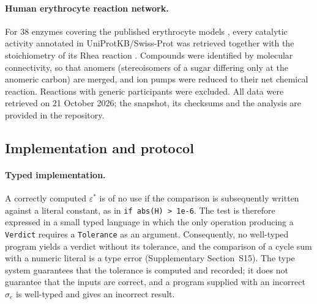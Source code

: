 \documentclass[11pt,a4paper]{article}
\theoremstyle{pstyle}
\theoremstyle{definition}
\theoremstyle{remark}
\newcommand{\cf}[1]{\texttt{#1}}
\newcommand{\eps}{\varepsilon}
\newcommand{\epsstar}{\eps^{\ast}}
\begin{document}
\paragraph{Human erythrocyte reaction network.} For $38$ enzymes
covering the published erythrocyte models \citep{mulquiney1999}, every
catalytic activity annotated in UniProtKB/Swiss-Prot
\citep{uniprot2025} was retrieved together with the stoichiometry of its
Rhea reaction \citep{bansal2022}. Compounds were identified by molecular
connectivity, so that anomers (stereoisomers of a sugar differing only
at the anomeric carbon) are merged, and ion pumps were reduced to their
net chemical reaction. Reactions with generic participants were
excluded. All data were retrieved on 21 October 2026; the snapshot, its
checksums and the analysis are provided in the repository.

\subsection{Implementation and protocol}
\label{sec:language}
\label{sec:protocol}

\paragraph{Typed implementation.} A correctly computed $\epsstar$ is of
no use if the comparison is subsequently written against a literal
constant, as in \verb|if abs(H) > 1e-6|. The test is therefore expressed
in a small typed language in which the only operation producing a
\cf{Verdict} requires a \cf{Tolerance} as an argument. Consequently, no
well-typed program yields a verdict without its tolerance, and the
comparison of a cycle sum with a numeric literal is a type error
(Supplementary Section~S15). The type system guarantees that the
tolerance is computed and recorded; it does not guarantee that the
inputs are correct, and a program supplied with an incorrect $\sigma_e$
is well-typed and gives an incorrect result.
\end{document}
